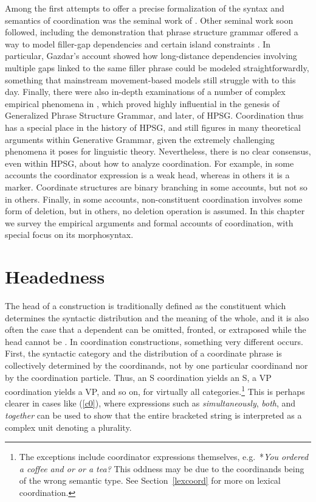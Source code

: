 Among the first attempts to offer a precise formalization of the syntax and semantics of coordination was the seminal work of \citet{gazdarc}. Other seminal work soon followed, including the demonstration that phrase structure grammar offered a way to model filler-gap dependencies and certain island constraints \citep{gazdar}. In particular, Gazdar's account showed how long-distance dependencies involving multiple gaps linked to the same filler phrase could be modeled straightforwardly, something that mainstream movement-based models still struggle with to this day. Finally, there were also 
 in-depth examinations of a number of complex empirical phenomena in  \citet{gazd1982}, which  proved highly influential in the genesis of Generalized Phrase Structure Grammar, and later, of HPSG. Coordination thus has a special place in the history of HPSG, and still figures  in many theoretical arguments within Generative Grammar,  given the extremely challenging phenomena it poses for linguistic theory. 
Nevertheless, there is no clear consensus, even within HPSG, about how to analyze coordination. For example, in some accounts the coordinator
expression is a weak head, whereas in others it is a marker. Coordinate structures are binary branching in some accounts, but not so in others. Finally, in  some accounts, non-constituent coordination involves some form of deletion, but in others, no deletion operation is assumed.  
In this chapter we survey the empirical arguments and formal accounts of coordination, with special focus on its morphosyntax.

\section{Headedness}
\label{coord:sec-headedness}

The head of a construction is traditionally defined as the constituent which determines the
syntactic distribution and the meaning of the whole, and it is also often the case that a dependent
can be omitted, fronted, or extraposed while the head cannot be \citep{zwicky85}. In coordination
constructions, something very different occurs. First, the syntactic category and the distribution
of a coordinate phrase is collectively determined by the coordinands, not by one particular
coordinand nor by the coordination particle. Thus, an S coordination yields an S, a VP coordination
yields a VP, and so on, for virtually all categories.\footnote{The exceptions include coordinator
  expressions themselves, e.g.\ *\emph{You ordered a coffee and or or a tea?} This oddness may be
  due to the coordinands being of the wrong semantic type. See Section~\ref{lexcoord} for more on
  lexical coordination.}  
This is perhaps clearer in cases like (\ref{c0}), where expressions such
as \emph{simultaneously}, \emph{both}, and \emph{together} can be used to show that the entire
bracketed string is interpreted as a complex unit denoting a plurality.


